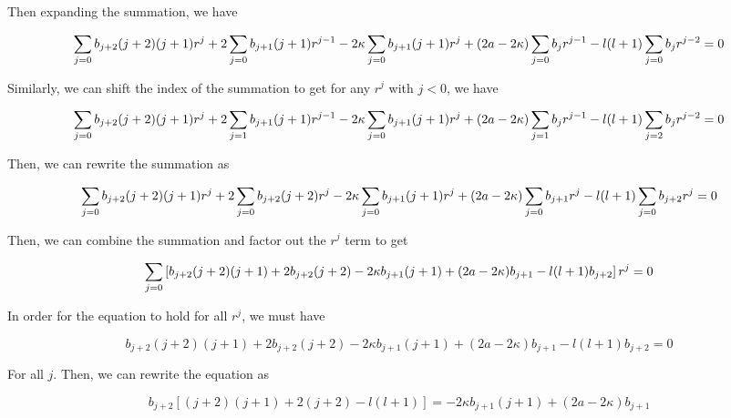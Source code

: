 \documentclass{article}
\begin{document}
Then expanding the summation, we have

\begin{equation*}
  \sum_{j = 0} b_{j+2} (j+2) (j+1) r^{j} + 2\sum_{j = 0} b_{j+1} (j+1) r^{j-1} - 2\kappa\sum_{j = 0} b_{j+1} (j+1) r^{j} + (2a-2\kappa) \sum_{j = 0} b_j r^{j-1} - l(l+1)\sum_{j = 0} b_j r^{j-2}  = 0 \\
\end{equation*}

Similarly, we can shift the index of the summation to get for any $r^{j}$ with $j < 0$, we have

\begin{equation*}
  \sum_{j = 0} b_{j+2} (j+2) (j+1) r^{j} + 2\sum_{j = 1} b_{j+1} (j+1) r^{j-1} - 2\kappa\sum_{j = 0} b_{j+1} (j+1) r^{j} + (2a-2\kappa) \sum_{j = 1} b_j r^{j-1} - l(l+1)\sum_{j = 2} b_j r^{j-2}  = 0 \\
\end{equation*}

Then, we can rewrite the summation as

\begin{equation*}
  \sum_{j = 0} b_{j+2} (j+2) (j+1) r^{j} + 2\sum_{j = 0} b_{j+2} (j+2) r^{j} - 2\kappa\sum_{j = 0} b_{j+1} (j+1) r^{j}+ (2a-2\kappa) \sum_{j = 0} b_{j+1} r^{j} - l(l+1)\sum_{j = 0} b_{j+2} r^{j}  = 0 \\
\end{equation*}

Then, we can combine the summation and factor out the $r^{j}$ term to get

\begin{equation}
  \sum_{j = 0} \left[ b_{j+2} (j+2) (j+1) + 2b_{j+2} (j+2) - 2\kappa b_{j+1} (j+1) + (2a-2\kappa) b_{j+1} - l(l+1) b_{j+2} \right] r^{j}  = 0 \\  
\end{equation}

In order for the equation to hold for all $r^{j}$, we must have

\begin{equation}
  b_{j+2} (j+2) (j+1) + 2b_{j+2} (j+2) - 2\kappa b_{j+1} (j+1) + (2a-2\kappa) b_{j+1} - l(l+1) b_{j+2} = 0
\end{equation}  

For all $j$. Then, we can rewrite the equation as

\begin{equation}
  b_{j+2} \left[ (j+2) (j+1) + 2(j+2) - l(l+1) \right] = - 2\kappa b_{j+1} (j+1) + (2a-2\kappa) b_{j+1}
\end{equation}
\end{document}
